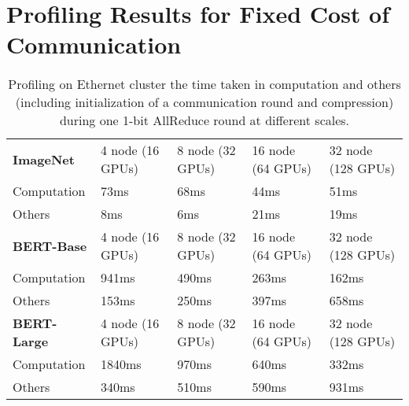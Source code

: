 \section{Profiling Results for Fixed Cost of Communication}
\label{appendix:sec:experiment}
\begin{table}[ht!]
  \caption{Profiling on Ethernet cluster the time taken in computation and others (including initialization of a communication round and compression) during one 1-bit AllReduce round at different scales.}
  \centering
  \begin{tabular}{l|llll}
  \hline
  \textbf{ImageNet} & 4 node (16 GPUs) & 8 node (32 GPUs) & 16 node (64 GPUs) & 32 node (128 GPUs) \\
  Computation      & 73ms & 68ms & 44ms & 51ms \\
  Others      & 8ms & 6ms & 21ms & 19ms \\
  \hline
  \textbf{BERT-Base} & 4 node (16 GPUs) & 8 node (32 GPUs) & 16 node (64 GPUs) & 32 node (128 GPUs) \\
  Computation      & 941ms & 490ms & 263ms & 162ms \\
  Others      & 153ms & 250ms & 397ms & 658ms \\
  \hline
  \textbf{BERT-Large} & 4 node (16 GPUs) & 8 node (32 GPUs) & 16 node (64 GPUs) & 32 node (128 GPUs) \\
  Computation      & 1840ms & 970ms & 640ms & 332ms \\
  Others      & 340ms & 510ms & 590ms & 931ms \\
  \hline
  \end{tabular}
\end{table}